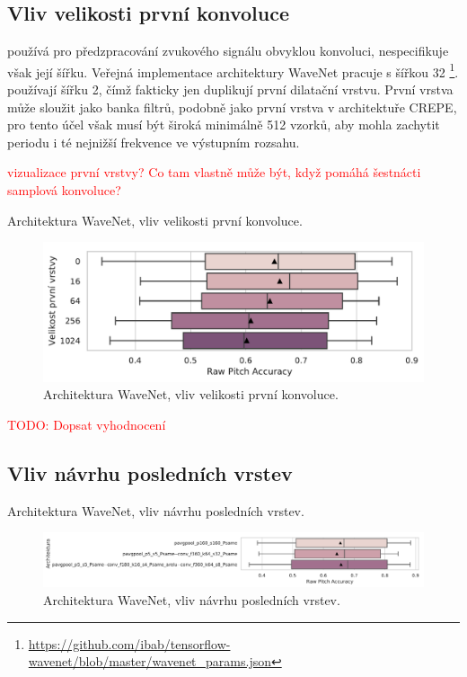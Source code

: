 \subsection{Vliv velikosti první konvoluce}

\cite{Oord2016} používá pro předzpracování zvukového signálu obvyklou konvoluci, nespecifikuje však její šířku. Veřejná implementace architektury WaveNet pracuje s šířkou 32 \footnote{\url{https://github.com/ibab/tensorflow-wavenet/blob/master/wavenet_params.json}}. \cite{Martak2018} používají šířku 2, čímž fakticky jen duplikují první dilatační vrstvu. První vrstva může sloužit jako banka filtrů, podobně jako první vrstva v architektuře CREPE, pro tento účel však musí být široká minimálně 512 vzorků, aby mohla zachytit periodu i té nejnižší frekvence ve výstupním rozsahu. 

\textcolor{red}{vizualizace první vrstvy? Co tam vlastně může být, když pomáhá šestnácti samplová konvoluce?}

\begin{table}[h!]
\centering
\caption{Architektura WaveNet, vliv velikosti první konvoluce.}\label{tab:wavenet_first_layer}
\end{table}

\begin{figure}[h]\centering
    \includegraphics[scale=0.6]{../img/figures/wavenet_first_layer.pdf}
\caption{Architektura WaveNet, vliv velikosti první konvoluce.}\label{obr:wavenet_first_layer}
\end{figure}

\textcolor{red}{TODO: Dopsat vyhodnocení}

\subsection{Vliv návrhu posledních vrstev}

\begin{table}[h!]
\centering
\caption{Architektura WaveNet, vliv návrhu posledních vrstev.}\label{tab:wavenet_output_transform}
\end{table}

\begin{figure}[h]\centering
    \includegraphics[scale=0.6]{../img/figures/wavenet_output_transform.pdf}
\caption{Architektura WaveNet, vliv návrhu posledních vrstev.}\label{obr:wavenet_output_transform}
\end{figure}

